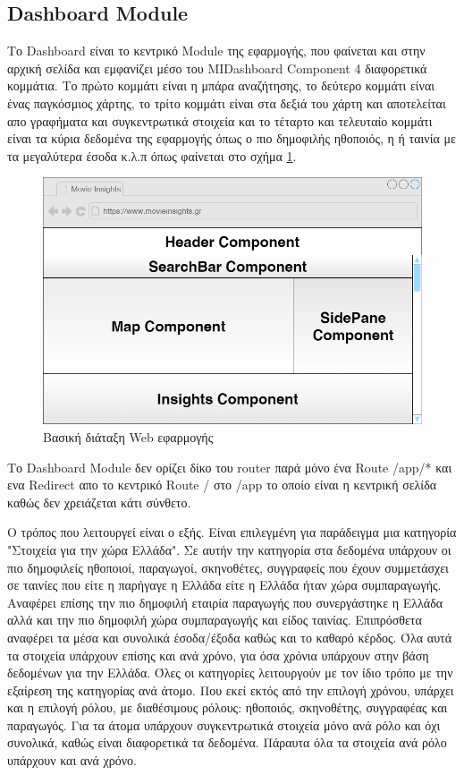\subsection{Dashboard Module}
Το Dashboard είναι το κεντρικό Module της εφαρμογής, που φαίνεται και στην αρχική σελίδα και εμφανίζει μέσο του MIDashboard Component 4 διαφορετικά κομμάτια. Το πρώτο κομμάτι είναι η μπάρα αναζήτησης, το δεύτερο κομμάτι είναι ένας παγκόσμιος χάρτης, το τρίτο κομμάτι είναι στα δεξιά του χάρτη και αποτελείται απο γραφήματα και συγκεντρωτικά στοιχεία και το τέταρτο και τελευταίο κομμάτι είναι τα κύρια δεδομένα της εφαρμογής όπως ο πιο δημοφιλής ηθοποιός, η ή ταινία με τα μεγαλύτερα έσοδα κ.λ.π όπως φαίνεται στο σχήμα \ref{wire:dashboard}.

\begin{figure}[H]
  \centering
  \includegraphics[width=145mm]{Chapters/5 - Architecture/Client/Images/dashboard_struct.png}
  \caption{Βασική διάταξη Web εφαρμογής}
  \label{wire:dashboard}
\end{figure}

Το Dashboard Module δεν ορίζει δίκο του router παρά μόνο ένα Route /app/* και ενα Redirect απο το κεντρικό Route / στο /app το οποίο είναι η κεντρική σελίδα καθώς δεν χρειάζεται κάτι σύνθετο. 

Ο τρόπος που λειτουργεί είναι ο εξής. Είναι επιλεγμένη για παράδειγμα μια κατηγορία "Στοιχεία για την χώρα Ελλάδα".
Σε αυτήν την κατηγορία στα δεδομένα υπάρχουν οι πιο δημοφιλείς ηθοποιοί, παραγωγοί, σκηνοθέτες, συγγραφείς που έχουν συμμετάσχει σε ταινίες που είτε η παρήγαγε η Ελλάδα είτε η Ελλάδα ήταν χώρα συμπαραγωγής. Αναφέρει επίσης την πιο δημοφιλή εταιρία παραγωγής που συνεργάστηκε η Ελλάδα αλλά και την πιο δημοφιλή χώρα συμπαραγωγής και είδος ταινίας. Επιπρόσθετα αναφέρει τα μέσα και συνολικά έσοδα/έξοδα καθώς και το καθαρό κέρδος. Όλα αυτά τα στοιχεία υπάρχουν επίσης και ανά χρόνο, για όσα χρόνια υπάρχουν στην βάση δεδομένων για την Ελλάδα. Όλες οι κατηγορίες λειτουργούν με τον ίδιο τρόπο με την εξαίρεση της κατηγορίας ανά άτομο. Που εκεί εκτός από την επιλογή χρόνου, υπάρχει και η επιλογή ρόλου, με διαθέσιμους ρόλους: ηθοποιός, σκηνοθέτης, συγγραφέας και παραγωγός. Για τα άτομα υπάρχουν συγκεντρωτικά στοιχεία μόνο ανά ρόλο και όχι συνολικά, καθώς είναι διαφορετικά τα δεδομένα. Πάραυτα όλα τα στοιχεία ανά ρόλο υπάρχουν και ανά χρόνο.

